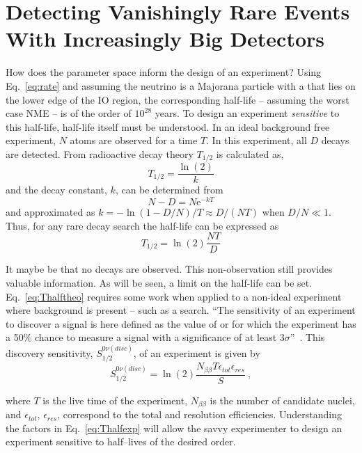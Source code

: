\section{Detecting Vanishingly Rare Events With Increasingly Big Detectors}

How does the \mbb{} parameter space inform the design of an experiment? Using Eq.~\ref{eq:rate} and assuming the neutrino is a Majorana particle with a \mbb{} that lies on the lower edge of the IO region, the corresponding half-life -- assuming the worst case NME -- is of the order of $10^{28}$ years. To design an experiment \textit{sensitive} to this half-life, half-life itself must be understood. In an ideal background free experiment, $N$ atoms are observed for a time $T$. In this experiment, all $D$ decays are detected. From radioactive decay theory $T_{1/2}$ is calculated as,
\begin{equation}
	T_{1/2} = \frac{\ln(2)}{k} 
\end{equation}
and the decay constant, $k$, can be determined from
\begin{equation}
	N - D = N\text{e}^{-kT}
\end{equation}
and approximated as $k = -\ln(1 - D/N)/T \approx D/(NT)$ when $D/N \ll 1$. Thus, for any rare decay search the half-life can be expressed as
\begin{equation}
	T_{1/2} = \ln(2)\frac{NT}{D} 
	\label{eq:Thalftheo}
\end{equation}

It maybe be that no decays are observed. This non-observation still provides valuable information. As will be seen, a limit on the half-life can be set. Eq.~\ref{eq:Thalftheo} requires some work when applied to a non-ideal experiment where background is present -- such as a \novbb{} search.  ``The sensitivity of an experiment to discover a signal is here defined as the value of \Thalf{} or \mbb{} for which the experiment has a 50\% chance to measure a signal with a significance of at least 3$\sigma$''~\cite{disc_prob0vbb}. This discovery sensitivity, $S^{0\nu(disc)}_{1/2}$, of an \novbb{} experiment is given by
\begin{equation}
	S^{0\nu(disc)}_{1/2} = \ln(2)\frac{N_{\beta\beta}T\epsilon_{tot}\epsilon_{res}}{S}~,
\label{eq:Thalfexp}
\end{equation}

where $T$ is the live time of the experiment, $N_{\beta\beta}$ is the number of \novbb{} candidate nuclei, and $\epsilon_{tot}$, $\epsilon_{res}$, correspond to the total and resolution efficiencies. Understanding the factors in Eq.~\ref{eq:Thalfexp} will allow the savvy experimenter to design an experiment sensitive to \novbb{} half--lives of the desired order. 

